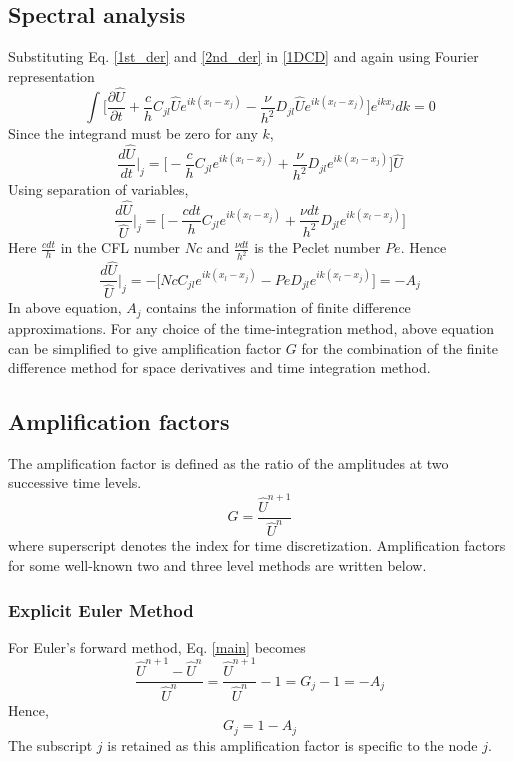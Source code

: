 \documentclass[fleqn]{article}
\begin{document}
\subsection{Spectral analysis}
Substituting Eq. \ref{1st_der} and \ref{2nd_der} in \ref{1DCD} and again using Fourier representation
\begin{equation*}
\int \Big[ \frac{\partial \hat{U}}{\partial t} + \frac{c}{h}C_{jl} \hat{U} e^{ik(x_l - x_j)} - \frac{\nu}{h^2}D_{jl} \hat{U} e^{ik(x_l - x_j)} \Big]  e^{i k x_j} dk  = 0
\end{equation*}
Since the integrand must be zero for any $k$,
\begin{equation*}
\frac{d \hat{U}}{d t} \bigg|_j = \bigg[ -\frac{c}{h}C_{jl}  e^{ik(x_l - x_j)} + \frac{\nu}{h^2}D_{jl}  e^{ik(x_l - x_j)} \bigg] \hat{U}
\end{equation*}
Using separation of variables,
\begin{equation*}
\frac{d \hat{U}}{\hat{U}} \bigg|_j = \bigg[ -\frac{c dt}{h}C_{jl}  e^{ik(x_l - x_j)} + \frac{\nu dt}{h^2}D_{jl}  e^{ik(x_l - x_j)} \bigg]
\end{equation*}
Here $\frac{c dt}{h}$ in the CFL number $Nc$ and $\frac{\nu dt}{h^2}$ is the Peclet number $Pe$. Hence
\begin{equation}
\frac{d \hat{U}}{\hat{U}} \bigg|_j = -\bigg[ Nc C_{jl}  e^{ik(x_l - x_j)} - Pe D_{jl}  e^{ik(x_l - x_j)} \bigg] = -A_j
\label{main}
\end{equation}
In above equation, $A_j$ contains the information of finite difference approximations. For any choice of the time-integration method, above equation can be simplified to give amplification factor $G$ for the combination of the finite difference method for space derivatives and time integration method.

\subsection{Amplification factors}
The amplification factor is defined as the ratio of the amplitudes at two successive time levels.
\begin{equation*}
G = \frac{\hat{U}^{n+1}}{\hat{U}^n}
\end{equation*}
where superscript denotes the index for time discretization. Amplification factors for some well-known two and three level methods are written below.
\subsubsection*{Explicit Euler Method}
For Euler's forward method, Eq. \ref{main} becomes 
\begin{equation*}
\frac{\hat{U}^{n+1} - \hat{U}^n}{\hat{U}^n} = \frac{\hat{U}^{n+1}}{\hat{U}^n} - 1 = G_j - 1 = -A_j
\end{equation*}
Hence,
\begin{equation*}
G_j = 1 - A_j
\end{equation*}
The subscript $j$ is retained as this amplification factor is specific to the node $j$.
\end{document}
